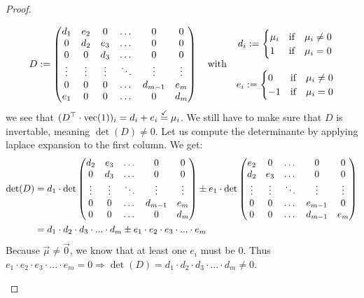 \begin{proof}
\begin{enumerate}
        $$D := \left(\begin{matrix}
            d_1 & e_2 & 0 & \dots & 0 & 0\\
            0 & d_2 & e_3 & \dots & 0 & 0\\
            0 & 0 & d_3 & \dots & 0 & 0\\
            \vdots & \vdots & \vdots & \ddots & \vdots & \vdots\\
            0 & 0 & 0 & \dots & d_{m-1} & e_m\\
            e_1 & 0 & 0 & \dots & 0 & d_m
        \end{matrix}\right) \quad\textrm{with}\quad 
        \begin{matrix}
            d_i := \begin{cases}
                \mu_i &\textrm{if}\quad \mu_i \neq 0\\
                1 &\textrm{if}\quad \mu_i = 0
            \end{cases}\\\\
            e_i := \begin{cases}
                0 &\textrm{if}\quad \mu_i \neq 0\\
                -1 &\textrm{if}\quad \mu_i = 0
            \end{cases}
        \end{matrix}$$
        we see that $(D^\top \cdot \operatorname{vec}(1))_i = d_i + e_i \stackrel{\checkmark}{=} \mu_i$. We still have to make sure that $D$ is invertable, meaning $\det(D) \neq 0$. Let us compute the determinante by applying laplace expansion to the first column. We get:
        \begin{align*}  
            \det(D) &= d_1 \cdot \det\left(\begin{matrix}
                d_2 & e_3 & \dots & 0 & 0\\
                0 & d_3 & \dots & 0 & 0\\
                \vdots & \vdots & \ddots & \vdots& \vdots\\
                0 & 0 & \dots & d_{m-1} & e_m\\
                0 & 0 & \dots & 0 & d_m
            \end{matrix}\right) \pm e_1 \cdot \det\left(\begin{matrix}
                e_2 & 0 & \dots & 0 & 0\\
                d_2 & e_3 & \dots & 0 & 0\\
                \vdots & \vdots & \ddots & \vdots& \vdots\\
                0 & 0 & \dots & e_{m-1} & 0\\
                0 & 0 & \dots & d_{m-1} & e_m
            \end{matrix}\right)\\
            &= d_1 \cdot d_2 \cdot d_3 \cdot ... \cdot d_m \pm e_1 \cdot e_2 \cdot e_3 \cdot ... \cdot e_m 
        \end{align*}
        Because $\vec\mu \neq \vec0$, we know that at least one $e_i$ must be 0. Thus $e_1 \cdot e_2 \cdot e_3 \cdot ... \cdot e_m = 0 \Rightarrow \det(D) = d_1 \cdot d_2 \cdot d_3 \cdot ... \cdot d_m \neq 0$.


\end{enumerate}
\end{proof}
